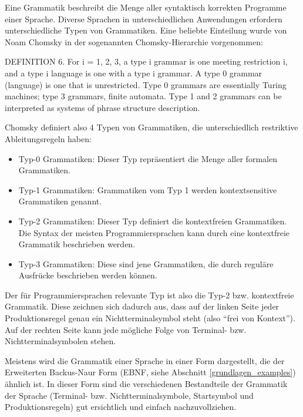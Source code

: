 Eine Grammatik beschreibt die Menge aller syntaktisch korrekten Programme einer Sprache. Diverse Sprachen in unterschiedlichen Anwendungen erfordern unterschiedliche Typen von Grammatiken. Eine beliebte Einteilung wurde von Noam Chomsky in der sogenannten Chomsky-Hierarchie vorgenommen:

\begin{myquote}DEFINITION 6. For i = 1, 2, 3, a type i grammar is one meeting restriction i, and a type i language is one with a type i grammar. A type 0 grammar (language) is one that is unrestricted. 
Type 0 grammars are essentially Turing machines; type 3 grammars, finite automata. Type 1 and 2 grammars can be interpreted as systems of phrase structure description. \cite{Chom59}
\end{myquote}

Chomsky definiert also 4 Typen von Grammatiken, die unterschiedlich restriktive Ab\-lei\-tungs\-re\-geln haben:

\begin{itemize}
  \item Typ-0 Grammatiken: Dieser Typ repräsentiert die Menge aller formalen Grammatiken.
  \item Typ-1 Grammatiken: Grammatiken vom Typ 1 werden kontextsensitive Grammatiken genannt.
  \item Typ-2 Grammatiken: Dieser Typ definiert die kontextfreien Grammatiken. Die Syntax der meisten Programmiersprachen kann durch eine kontextfreie Grammatik beschrieben werden.
  \item Typ-3 Grammatiken: Diese sind jene Grammatiken, die durch reguläre Ausfrücke beschrieben werden können.
\end{itemize}

Der für Programmiersprachen relevante Typ ist also die Typ-2 bzw. kontextfreie Grammatik. Diese zeichnen sich dadurch aus, dass auf der linken Seite jeder Produktionsregel genau ein Nichtterminalsymbol steht (also ``frei von Kontext''). Auf der rechten Seite kann jede mögliche Folge von Terminal- bzw. Nichtterminalsymbolen stehen.



Meistens wird die Grammatik einer Sprache in einer Form dargestellt, die der Erweiterten Backus-Naur Form (EBNF, siehe Abschnitt \ref{grundlagen_examples}) ähnlich ist. In dieser Form sind die verschiedenen Bestandteile der Grammatik der Sprache (Terminal- bzw. Nichtterminalsymbole, Startsymbol und Produktionsregeln) gut ersichtlich und einfach nachzuvollziehen.

